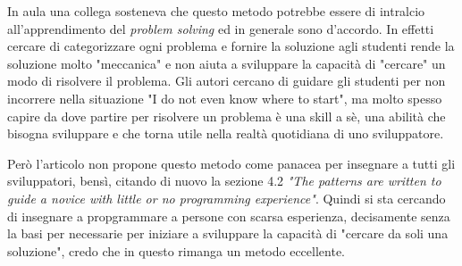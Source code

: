 \documentclass[a4paper]{article}
\begin{document}
In aula una collega sosteneva che questo metodo potrebbe essere di intralcio all'apprendimento del \textit{problem solving} ed in generale sono d'accordo.
In effetti cercare di categorizzare ogni problema e fornire la soluzione agli studenti rende la soluzione molto "meccanica" e non aiuta a sviluppare la capacità di "cercare" un modo di risolvere il problema.
Gli autori cercano di guidare gli studenti per non incorrere nella situazione "I do not even know where to start", ma molto spesso capire da dove partire per risolvere un problema è una skill a sè, una abilità che bisogna sviluppare e che torna utile nella realtà quotidiana di uno sviluppatore.


Però l'articolo non propone questo metodo come panacea per insegnare a tutti gli sviluppatori, bensì, citando di nuovo la sezione 4.2 \textit{"The patterns are written to guide a novice with little or no programming experience"}.
Quindi si sta cercando di insegnare a propgrammare a persone con scarsa esperienza, decisamente senza la basi per necessarie per iniziare a sviluppare la capacità di "cercare da soli una soluzione", credo che in questo rimanga un metodo eccellente.
\end{document}
